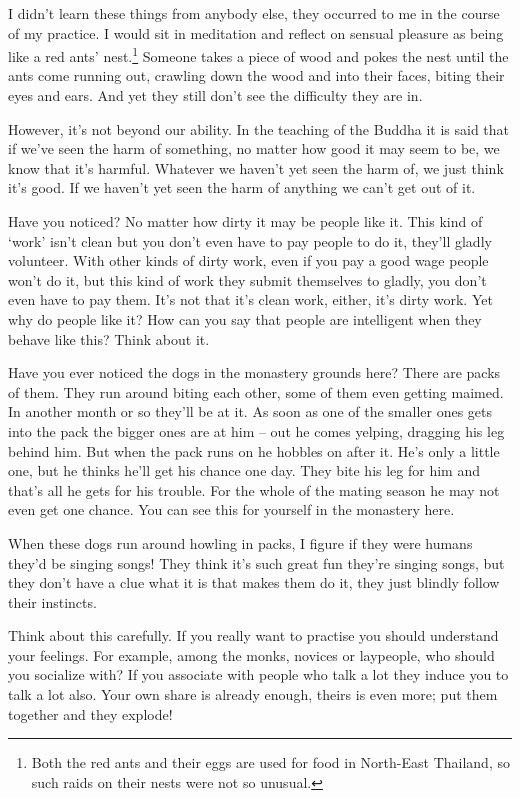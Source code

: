 I didn't learn these things from anybody else, they occurred to me in the course of my practice. I would sit in meditation and reflect on sensual pleasure as being like a red ants' nest.\footnote{Both the red ants and their eggs are used for food in North-East Thailand, so such raids on their nests were not so unusual.} Someone takes a piece of wood and pokes the nest until the ants come running out, crawling down the wood and into their faces, biting their eyes and ears. And yet they still don't see the difficulty they are in. 

However, it's not beyond our ability. In the teaching of the Buddha it is said that if we've seen the harm of something, no matter how good it may seem to be, we know that it's harmful. Whatever we haven't yet seen the harm of, we just think it's good. If we haven't yet seen the harm of anything we can't get out of it. 

Have you noticed? No matter how dirty it may be people like it. This kind of `work' isn't clean but you don't even have to pay people to do it, they'll gladly volunteer. With other kinds of dirty work, even if you pay a good wage people won't do it, but this kind of work they submit themselves to gladly, you don't even have to pay them. It's not that it's clean work, either, it's dirty work. Yet why do people like it? How can you say that people are intelligent when they behave like this? Think about it. 

Have you ever noticed the dogs in the monastery grounds here? There are packs of them. They run around biting each other, some of them even getting maimed. In another month or so they'll be at it. As soon as one of the smaller ones gets into the pack the bigger ones are at him -- out he comes yelping, dragging his leg behind him. But when the pack runs on he hobbles on after it. He's only a little one, but he thinks he'll get his chance one day. They bite his leg for him and that's all he gets for his trouble. For the whole of the mating season he may not even get one chance. You can see this for yourself in the monastery here. 

When these dogs run around howling in packs, I figure if they were humans they'd be singing songs! They think it's such great fun they're singing songs, but they don't have a clue what it is that makes them do it, they just blindly follow their instincts. 

Think about this carefully. If you really want to practise you should understand your feelings. For example, among the monks, novices or laypeople, who should you socialize with? If you associate with people who talk a lot they induce you to talk a lot also. Your own share is already enough, theirs is even more; put them together and they explode! 

